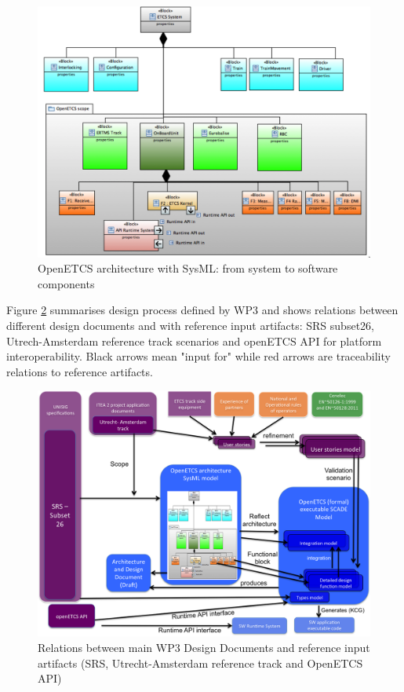 \documentclass[11pt]{template/openetcs_report}
\begin{document}
\begin{figure}[htbp]
\centering
\includegraphics[width=.9\linewidth]
{./images/OpenETCSArchitectureAndDesignModel.png}
\caption{\label{fig:OpenETCSArchitectureAndDesignModel}OpenETCS architecture with SysML: from system to software components}
\end{figure}

Figure \ref{fig:WP3DesignProcess} summarises design process defined by WP3 and shows relations between different design documents and with reference input artifacts: SRS subset26, Utrech-Amsterdam reference track scenarios and openETCS API for platform interoperability. Black arrows mean "input for" while red arrows are traceability relations to reference artifacts.

\begin{figure}[htbp]
\centering
\includegraphics[width=1.0\linewidth]
{./images/WP3DesignProcess.png}
\caption{\label{fig:WP3DesignProcess}Relations between main WP3 Design Documents and reference input artifacts (SRS, Utrecht-Amsterdam reference track and OpenETCS API)}
\end{figure}
\end{document}
